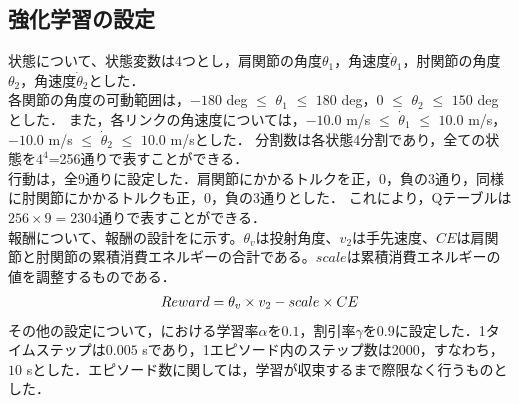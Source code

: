 \begin{small}
\subsection{強化学習の設定}
状態について、状態変数は4つとし，肩関節の角度$\theta_{1}$，角速度$\dot{\theta}_{1}$，肘関節の角度$\theta_{2}$，角速度$\dot{\theta}_{2}$とした．\\
各関節の角度の可動範囲は，$-180$ deg $\le$ $\theta_{1}$ $\le$ $180$ deg，$0$ $\le$ $\theta_{2}$ $\le$ $150$ deg\cite{range}とした．
また，各リンクの角速度については，$-10.0$ m/s $\le$ $\dot{\theta}_{1}$ $\le$ $10.0$ m/s，$-10.0$ m/s $\le$ $\dot{\theta}_{2}$ $\le$ $10.0$ m/sとした．
分割数は各状態4分割であり，全ての状態を$4^{4}$=256通りで表すことができる．\\
行動は，全9通りに設定した．肩関節にかかるトルクを正，0，負の3通り，同様に肘関節にかかるトルクも正，0，負の3通りとした．
これにより，Qテーブルは$256 \times 9=2304$通りで表すことができる．\\
報酬について、報酬の設計をに示す。$\theta_{v}$は投射角度、$v_{2}$は手先速度、$CE$は肩関節と肘関節の累積消費エネルギーの合計である。$scale$は累積消費エネルギーの値を調整するものである．
\begin{eqnarray}
  \equlabel{9}
  Reward = \theta_{v} \times v_{2} - scale \times CE
\end{eqnarray}
その他の設定について，における学習率$\alpha$を$0.1$，割引率$\gamma$を$0.9$に設定した．1タイムステップは$0.005$ sであり，1エピソード内のステップ数は2000，すなわち，$10$ sとした．エピソード数に関しては，学習が収束するまで際限なく行うものとした．

\end{small}
